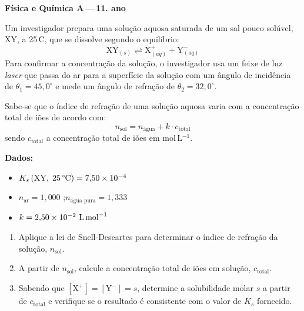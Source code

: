 \documentclass[12pt,a4paper]{article}
\begin{document}
\begin{center}
  {\small\textcolor{azul}{\textbf{F\'isica e Qu\'imica A\,---\,11.\textordmasculine{} ano}}}
\end{center}

\bigskip

\begin{mdframed}[style=enunciado]

Um investigador prepara uma solu\c{c}\~ao aquosa saturada de um sal pouco
sol\'uvel, XY, a 25\,\textdegree C, que se dissolve segundo o equil\'ibrio:
%
\[
  \mathrm{XY}_{(s)} \rightleftharpoons \mathrm{X}^{+}_{(aq)}
  + \mathrm{Y}^{-}_{(aq)}
\]
%
Para confirmar a concentra\c{c}\~ao da solu\c{c}\~ao, o investigador usa um
feixe de luz \textit{laser} que passa do ar para a superf\'icie da solu\c{c}\~ao
com um \^angulo de incid\^encia de $\theta_1 = 45{,}0^\circ$ e mede um
\^angulo de refra\c{c}\~ao de $\theta_2 = 32{,}0^\circ$.

Sabe-se que o \'indice de refra\c{c}\~ao de uma solu\c{c}\~ao aquosa varia
com a concentra\c{c}\~ao total de i\~oes de acordo com:
%
\[
  n_{\text{sol}} = n_{\text{\'{a}gua}} + k \cdot c_{\text{total}}
\]
%
sendo $c_{\text{total}}$ a concentra\c{c}\~ao total de i\~oes em
mol\,L$^{-1}$.

\end{mdframed}

\medskip

\begin{mdframed}[style=dados]
\textbf{Dados:}
\begin{itemize}[leftmargin=1.5em, itemsep=3pt, topsep=4pt]
  \item $K_s\,(\mathrm{XY},\;25\,\text{\textdegree C}) = 7{,}50 \times 10^{-4}$
  \item $n_{\text{ar}} = 1{,}000$ \quad;\quad $n_{\text{\'{a}gua pura}} = 1{,}333$
  \item $k = 2{,}50 \times 10^{-2}\ \text{L\,mol}^{-1}$
\end{itemize}
\end{mdframed}

\medskip

\begin{enumerate}[label=\textbf{\alph*)}, leftmargin=1.8em, itemsep=8pt]

  \item Aplique a lei de Snell-Descartes para determinar o \'indice de
        refra\c{c}\~ao da solu\c{c}\~ao, $n_{\text{sol}}$.

  \item A partir de $n_{\text{sol}}$, calcule a concentra\c{c}\~ao total de
        i\~oes em solu\c{c}\~ao, $c_{\text{total}}$.

  \item Sabendo que $[\mathrm{X}^+] = [\mathrm{Y}^-] = s$, determine a
        solubilidade molar $s$ a partir de $c_{\text{total}}$ e verifique se
        o resultado \'e consistente com o valor de $K_s$ fornecido.

\end{enumerate}
\end{document}
